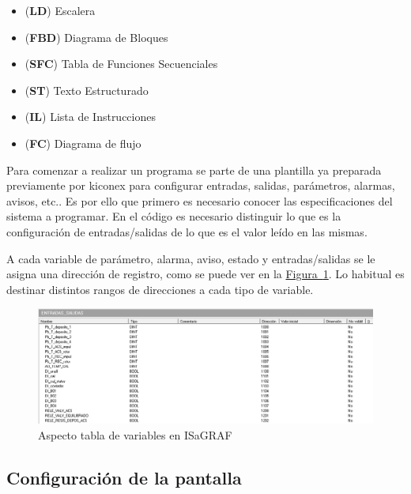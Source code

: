 \begin{itemize}
  \item (\textbf{LD}) Escalera  
  \item (\textbf{FBD}) Diagrama de Bloques 
  \item (\textbf{SFC}) Tabla de Funciones Secuenciales 
  \item (\textbf{ST}) Texto Estructurado 
  \item (\textbf{IL}) Lista de Instrucciones 
  \item (\textbf{FC}) Diagrama de flujo 
\end{itemize}

Para comenzar a realizar un programa se parte de una plantilla ya preparada previamente por kiconex para configurar entradas, salidas, parámetros, alarmas, avisos, etc.. Es por ello que primero es necesario conocer las especificaciones del sistema a programar. En el código es necesario distinguir lo que es la configuración de entradas/salidas de lo que es el valor leído en las mismas.


A cada variable de parámetro, alarma, aviso, estado y entradas/salidas se le asigna una dirección de registro, como se puede ver en la \hyperref[figura:variablesIsagraf]{Figura~\ref{figura:variablesIsagraf}}. Lo habitual es destinar distintos rangos de direcciones a cada tipo de variable. 

\begin{figure}[H]
  \centering
  \includegraphics[width=\textwidth, keepaspectratio]{img/tablaRegistros}
  \caption{Aspecto tabla de variables en ISaGRAF}
  \label{figura:variablesIsagraf}
\end{figure}

\subsection{Configuración de la pantalla}
\label{subsec:displayconfig}

